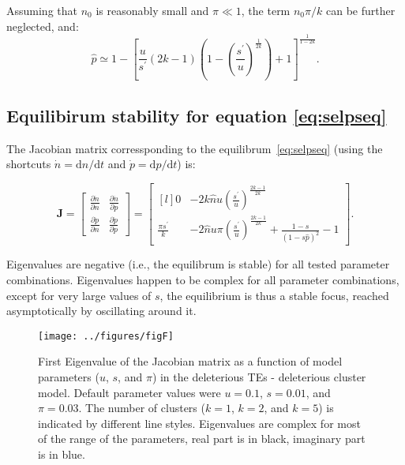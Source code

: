 \documentclass[10pt,a4paper]{article}
\begin{document}
\begin{appendices}
Assuming that $n_0$ is reasonably small and $\pi \ll 1$, the term $n_0 \pi / k$ can be further neglected, and:
\begin{equation*}
		\hat p \simeq 1-\left[\frac{u}{s^\prime}(2k-1)(1-\left(\frac{s^\prime}{u}\right)^\frac{1}{2k})+1\right]^\frac{1}{1-2k}.
\end{equation*}

\subsection{\label{app:selpseq} Equilibirum stability for equation \ref{eq:selpseq}}

The Jacobian matrix corressponding to the equilibrum~\ref{eq:selpseq} (using the shortcuts $\dot n = \mathrm d n / \mathrm d t $ and  $\dot p = \mathrm d p / \mathrm d t$) is:

\begin{equation*}
\bm J = 
   \begin{bmatrix}  \frac{\partial \dot n}{\partial n} &  \frac{\partial \dot n}{\partial p} \\[1em]
					\frac{\partial \dot p}{\partial n} &  \frac{\partial \dot p}{\partial p} \end{bmatrix} =
   \begin{bmatrix*}[l]
				0 & -2 k \hat n u \left( \frac{s^\prime}{u}\right) ^\frac{2k-1}{2k} \\[1em]
				\frac{\pi s^\prime}{k} & -2 \hat n u \pi \left( \frac{s^\prime}{u}\right) ^\frac{2k-1}{2k} + \frac{1-s}{(1-s \hat p)^2} - 1
	\end{bmatrix*}.
\end{equation*}

Eigenvalues are negative (i.e., the equilibrum is stable) for all tested parameter combinations. Eigenvalues happen to be complex for all parameter combinations, except for very large values of $s$, the equilibrium is thus a stable focus, reached asymptotically by oscillating around it. 

\begin{figure}
\begin{adjustwidth}{-2in}{0in}
\begin{flushright}
	\texttt{[image: ../figures/figF]}
	\caption{\label{fig:figF}  First Eigenvalue of the Jacobian matrix as a function of model parameters ($u$, $s$, and $\pi$) in the deleterious TEs - deleterious cluster model. Default parameter values were $u=0.1$, $s=0.01$, and $\pi=0.03$. The number of clusters ($k=1$, $k=2$, and $k=5$) is indicated by different line styles. Eigenvalues are complex for most of the range of the parameters, real part is in black, imaginary part is in blue. }
\end{flushright}\end{adjustwidth}
\end{figure}

\end{appendices}
\end{document}
